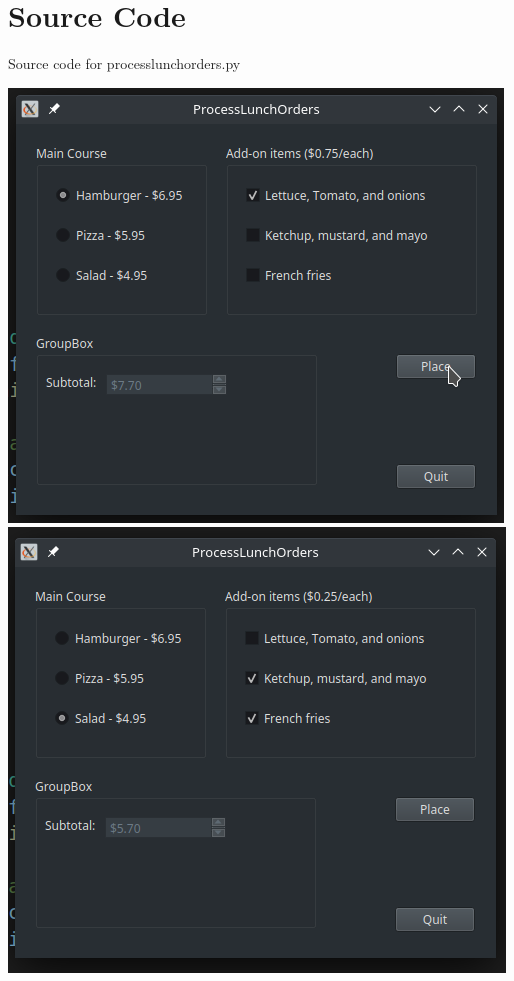 \documentclass[12pt]{article}
\begin{document}
\maketitle
\pagebreak


\section{Source Code}

Source code for \textsf{processlunchorders.py}


% 

\newpage

\includegraphics{Example1.png}
\includegraphics{Example2.png}
\end{document}
